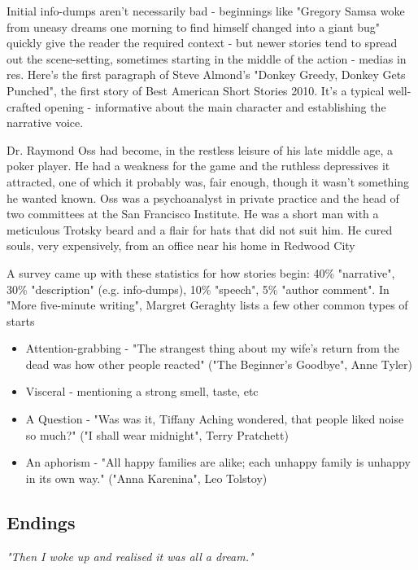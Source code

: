 \documentclass[11pt]{article}
\newenvironment{narrow}[2]{%
 \begin{list}{}{%
  \setlength{\topsep}{0pt}%
  \setlength{\leftmargin}{#1}%
  \setlength{\rightmargin}{#2}%
  \setlength{\listparindent}{\parindent}%
  \setlength{\itemindent}{\parindent}%
  \setlength{\parsep}{\parskip}%
 }%
\item[]}{\end{list}}
\begin{document}
Initial info-dumps aren't necessarily bad - beginnings like "Gregory Samsa woke from uneasy dreams one morning to find himself changed into a giant bug" quickly give the reader the required context - but newer stories tend to spread out the scene-setting, sometimes starting in the middle of the action - medias in res. 
Here's the first paragraph of Steve Almond's "Donkey Greedy, Donkey Gets Punched", the first story of Best American Short Stories 2010. It's a typical well-crafted opening - informative about the main character and establishing the narrative voice.

\begin{narrow}{1.0cm}{1.0cm}
Dr. Raymond Oss had become, in the restless leisure of his late middle age, a 
poker player. He had a weakness for the game and the ruthless depressives it 
attracted, one of which it probably was, fair enough, though it wasn't 
something he wanted known. Oss was a psychoanalyst in private practice and
 the head of two committees at the San Francisco Institute. He was a short 
man with a meticulous Trotsky beard and a flair for hats that did not suit 
him. He cured souls, very expensively, from an office near his home in 
Redwood City
\end{narrow}




A survey came up with these statistics for how stories begin: 40\% "narrative", 30\% "description" (e.g. info-dumps), 10\% "speech", 5\% "author comment". In "More five-minute writing", Margret Geraghty lists a few other common types of starts


\begin{itemize}
\item Attention-grabbing - "The strangest thing about my wife's return from the dead was how other people reacted" ("The Beginner's Goodbye", Anne Tyler)

\item Visceral - mentioning a strong smell, taste, etc

\item A Question - "Was was it, Tiffany Aching wondered, that people liked noise so much?" ("I shall wear midnight", Terry Pratchett)

\item An aphorism - "All happy families are alike; each unhappy family is unhappy in its own way." ("Anna Karenina", Leo Tolstoy)
\end{itemize}

\subsection*{Endings}
\textit{"Then I woke up and realised it was all a dream."}
\end{document}
